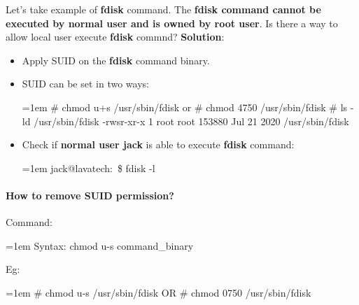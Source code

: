 \begin{flushleft}
	Let's take example of \textbf{fdisk} command. 
	\newline
	The \textbf{fdisk command cannot be executed by normal user and is owned by root user}. Is there a way to allow local user execute \textbf{fdisk} commnd?
	\newline
	\textbf{Solution}: 
	\begin{itemize}
		\item Apply SUID on the \textbf{fdisk} command binary.
		\item 	SUID can be set in two ways:
		\bigskip
		\begin{tcolorbox}[breakable,notitle,boxrule=-0pt,colback=black,colframe=black]
			\color{green}
			\font=1em
			\# chmod u+s  /usr/sbin/fdisk
			\newline
			or
			\newline
			\# chmod 4750 /usr/sbin/fdisk
			\newline
			\newline
			\# ls -ld /usr/sbin/fdisk
			\newline
			\color{white}
			-rwsr-xr-x 1 root root 153880 Jul 21  2020 /usr/sbin/fdisk
			\font=4pt
		\end{tcolorbox}
		\item Check if \textbf{normal user jack} is able to execute \textbf{fdisk} command:
		\begin{tcolorbox}[breakable,notitle,boxrule=-0pt,colback=black,colframe=black]
			\color{green}
			\font=1em
			jack@lavatech:~\$ fdisk -l
			\font=4pt
		\end{tcolorbox}
	\end{itemize}
	\paragraph{How to remove SUID permission?}
	Command:
	\begin{tcolorbox}[breakable,notitle,boxrule=0pt,colback=pink,colframe=pink]
		\color{black}
		\font=1em
		Syntax: chmod u-s command\_binary
		\font=4pt
	\end{tcolorbox}
	Eg:
	\begin{tcolorbox}[breakable,notitle,boxrule=-0pt,colback=black,colframe=black]
		\color{green}
		\font=1em
		\# chmod u-s  /usr/sbin/fdisk
		\newline
		\color{white}
		OR
		\color{green}
		\newline
		\# chmod 0750 /usr/sbin/fdisk
		\font=4pt
	\end{tcolorbox}

	
\end{flushleft}

\newpage

